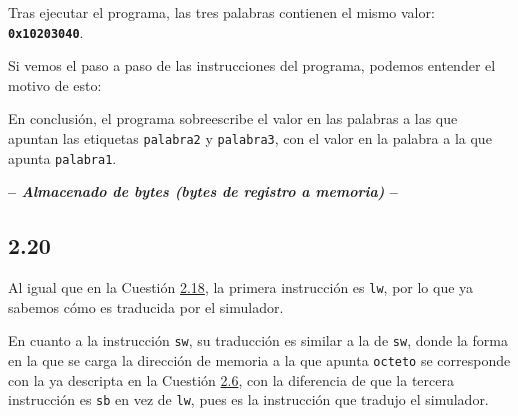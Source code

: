 \documentclass[a4paper]{report}
\begin{document}
Tras ejecutar el programa, las tres palabras contienen el mismo valor: \textbf{\texttt{0x10203040}}.

Si vemos el paso a paso de las instrucciones del programa, podemos entender el motivo de esto:

\begingroup
\setlength{\emergencystretch}{3em}
\endgroup

En conclusión, el programa sobreescribe el valor en las palabras a las que apuntan las etiquetas \texttt{palabra2} y \texttt{palabra3}, con el valor en la palabra a la que apunta \texttt{palabra1}.

\begin{center}
    \large\textbf{-- \textsl{Almacenado de bytes (bytes de registro a memoria)} --}
\end{center}

\subsection*{2.20}

Al igual que en la Cuestión \hyperref[sec:c2-18]{2.18}, la primera instrucción es \texttt{lw}, por lo que ya sabemos cómo es traducida por el simulador.

En cuanto a la instrucción \texttt{sw}, su traducción es similar a la de \texttt{sw}, donde la forma en la que se carga la dirección de memoria a la que apunta \texttt{octeto} se corresponde con la ya descripta en la Cuestión \hyperref[sec:c2-6]{2.6}, con la diferencia de que la tercera instrucción es \texttt{sb} en vez de \texttt{lw}, pues es la instrucción que tradujo el simulador.
\end{document}
